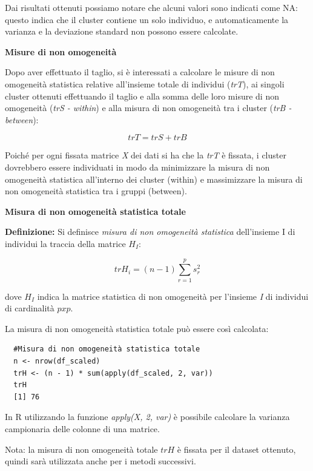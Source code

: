 Dai risultati ottenuti possiamo notare che alcuni valori sono indicati come NA: questo indica che il cluster contiene un solo individuo, e automaticamente la varianza e la deviazione standard non possono essere calcolate.

\vspace{5mm}
\noindent \textbf{Misure di non omogeneità}

Dopo aver effettuato il taglio, si è interessati a calcolare le misure di non omogeneità statistica relative all'insieme totale di individui (\textit{trT}), ai singoli cluster ottenuti effettuando il taglio e alla somma delle loro misure di non omogeneità (\textit{trS - within}) e alla misura di non omogeneità tra i cluster (\textit{trB - between}):

\[trT = trS + trB\]

Poiché per ogni fissata matrice \textit{X} dei dati si ha che la \textit{trT} è fissata, i cluster dovrebbero essere individuati in modo da minimizzare la misura di non omogeneità statistica all'interno dei cluster (within) e massimizzare la misura di non omogeneità statistica tra i gruppi (between).

\vspace{5mm}
\noindent \textbf{Misura di non omogeneità statistica totale}

\textbf{Definizione:} Si definisce \textit{misura di non omogeneità statistica} dell'insieme I di individui la traccia della matrice $H_I$:

\[trH_i = (n-1) \sum_{r=1}^p s_r^2\]

dove $H_I$ indica la matrice statistica di non omogeneità per l'insieme \textit{I} di individui di cardinalità $p x p$.

La misura di non omogeneità statistica totale può essere così calcolata:

\vspace{5mm}
\begin{lstlisting}
  #Misura di non omogeneità statistica totale
  n <- nrow(df_scaled)
  trH <- (n - 1) * sum(apply(df_scaled, 2, var))
  trH
  [1] 76
\end{lstlisting}
\vspace{5mm}

In R utilizzando la funzione \textit{apply(X, 2, var)} è possibile calcolare la varianza campionaria delle colonne di una matrice.

\vspace{5mm}
\noindent Nota: la misura di non omogeneità totale $trH$ è fissata per il dataset ottenuto, quindi sarà utilizzata anche per i metodi successivi.

